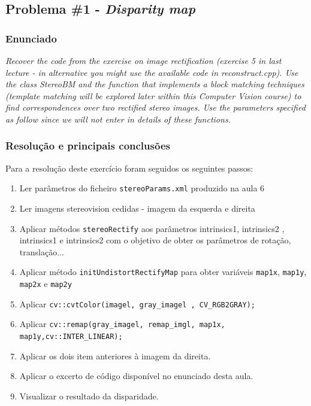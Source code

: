 \documentclass[portuguese, times, mirror]{revdetua}
\begin{document}
\subsection{Problema \#1 - \textit{Disparity map}}

\subsubsection{Enunciado}
\textit{Recover the code from the exercise on image rectification (exercise 5 in last lecture - in alternative  you might use the available code in reconstruct.cpp). Use the class StereoBM and the function that implements a block matching techniques (template matching will be explored later within this Computer Vision course) to find correspondences over two rectified stereo images. Use the parameters specified as follow since we will not enter in details of these functions.}


\subsubsection{Resolução e principais conclusões}

Para a resolução deste exercício foram seguidos os seguintes passos: 

\begin{enumerate}
    \item Ler parâmetros do ficheiro \texttt{stereoParams.xml} produzido na aula 6
    \item Ler imagens stereovision cedidas - imagem da esquerda e direita
    \item Aplicar métodos \texttt{stereoRectify} aos parâmetros intrinsics1, intrinsics2 , intrinsics1 e intrinsics2 com o objetivo de obter os parâmetros de rotação, translação...
    \item Aplicar método \texttt{initUndistortRectifyMap} para obter variáveis \texttt{map1x}, \texttt{map1y}, \texttt{map2x} e \texttt{map2y} 
    \item Aplicar \texttt{cv::cvtColor(imagel, gray\_imagel , CV\_RGB2GRAY);}
    \item Aplicar \texttt{cv::remap(gray\_imagel, remap\_imgl, map1x, map1y,cv::INTER\_LINEAR);}
    \item Aplicar os dois item anteriores à imagem da direita.
    \item Aplicar o excerto de código disponível no enunciado desta aula.
    \item Visualizar o resultado da disparidade. 

    
\end{enumerate}
\end{document}
